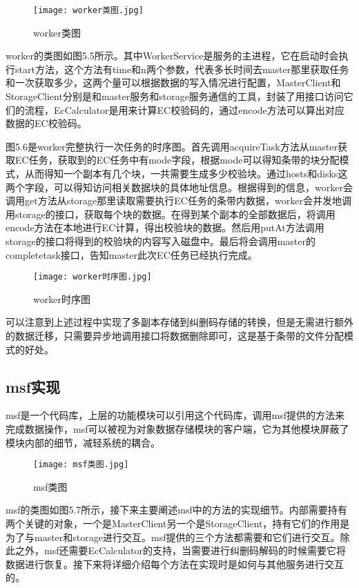 \begin{figure}
  \centering
  \texttt{[image: worker类图.jpg]}
  \caption{worker类图}
\end{figure}

worker的类图如图5.5所示。其中WorkerService是服务的主进程，它在启动时会执行start方法，这个方法有time和n两个参数，代表多长时间去master那里获取任务和一次获取多少，这两个量可以根据数据的写入情况进行配置，MasterClient和StorageClient分别是和master服务和storage服务通信的工具，封装了用接口访问它们的流程，EcCalculator是用来计算EC校验码的，通过encode方法可以算出对应数据的EC校验码。

图5.6是worker完整执行一次任务的时序图。首先调用acquireTask方法从master获取EC任务，获取到的EC任务中有mode字段，根据mode可以得知条带的块分配模式，从而得知一个副本有几个块，一共需要生成多少校验块。通过hosts和disks这两个字段，可以得知访问相关数据块的具体地址信息。根据得到的信息，worker会调用get方法从storage那里读取需要执行EC任务的条带内数据，worker会并发地调用storage的接口，获取每个块的数据。在得到某个副本的全部数据后，将调用encode方法在本地进行EC计算，得出校验块的数据。然后用putAt方法调用storage的接口将得到的校验块的内容写入磁盘中。最后将会调用master的completetask接口，告知master此次EC任务已经执行完成。

\begin{figure}
  \centering
  \texttt{[image: worker时序图.jpg]}
  \caption{worker时序图}
\end{figure}

可以注意到上述过程中实现了多副本存储到纠删码存储的转换，但是无需进行额外的数据迁移，只需要异步地调用接口将数据删除即可，这是基于条带的文件分配模式的好处。

\subsection{msf实现}%
msf是一个代码库，上层的功能模块可以引用这个代码库，调用msf提供的方法来完成数据操作，msf可以被视为对象数据存储模块的客户端，它为其他模块屏蔽了模块内部的细节，减轻系统的耦合。

\begin{figure}
  \centering
  \texttt{[image: msf类图.jpg]}
  \caption{msf类图}
\end{figure}

msf的类图如图5.7所示，接下来主要阐述msf中的方法的实现细节。内部需要持有两个关键的对象，一个是MasterClient另一个是StorageClient，持有它们的作用是为了与master和storage进行交互。msf提供的三个方法都需要和它们进行交互。除此之外，msf还需要EcCalculator的支持，当需要进行纠删码解码的时候需要它将数据进行恢复。接下来将详细介绍每个方法在实现时是如何与其他服务进行交互的。

